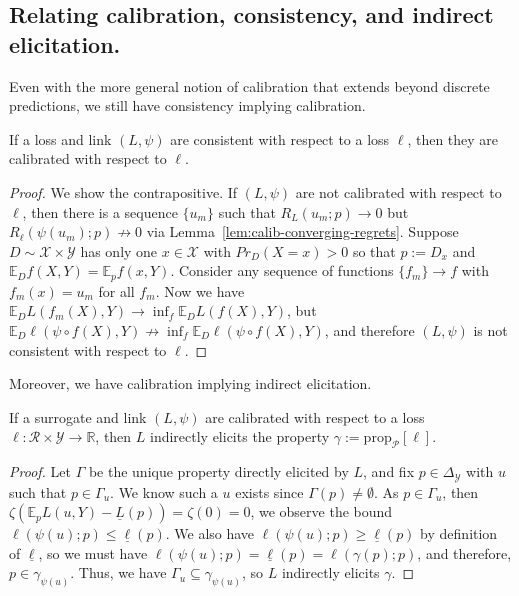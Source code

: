 \documentclass[anon,12pt]{colt2021} %
\newcommand{\reals}{\mathbb{R}}
\newcommand{\simplex}{\Delta_\Y}
\newcommand{\prop}[2][\mathcal{P}]{\mathrm{prop}_{#1}[#2]}
\newcommand{\E}{\mathbb{E}}
\newcommand{\R}{\mathcal{R}}
\newcommand{\X}{\mathcal{X}}
\newcommand{\Y}{\mathcal{Y}}
\newcommand{\exploss}[3]{\E_{#3} #1(#2,Y)}
\newcommand{\risk}[1]{\underline{#1}}
\begin{document}
\subsection{Relating calibration, consistency, and indirect elicitation.}
Even with the more general notion of calibration that extends beyond discrete predictions, we still have consistency implying calibration.
\begin{proposition}\label{prop:consistent-implies-calibrated}
	If a loss and link $(L, \psi)$ are consistent with respect to a loss $\ell$, then they are calibrated with respect to $\ell$.
\end{proposition}
\begin{proof}
	We show the contrapositive.
	If $(L, \psi)$ are not calibrated with respect to $\ell$, then there is a sequence $\{u_m\}$ such that $R_L(u_m; p) \to 0$ but $R_\ell(\psi(u_m); p) \not \to 0$ via Lemma~\ref{lem:calib-converging-regrets}.
	Suppose $D \sim \X \times\Y$ has only one $x \in \X$ with $Pr_D(X = x) > 0$ so that $p := D_x$ and $\E_D f(X,Y) = \E_p f(x, Y)$.
	Consider any sequence of functions $\{f_m\} \to f$ with $f_m(x) = u_m$ for all $f_m$.
	Now we have $\E_D L(f_m(X), Y) \to \inf_f \E_D L(f(X), Y)$, but $\E_D \ell(\psi \circ f(X), Y) \not \to \inf_f \E_D \ell(\psi \circ f(X), Y)$, and therefore $(L, \psi)$ is not consistent with respect to $\ell$.
\end{proof}

Moreover, we have calibration implying indirect elicitation.
\begin{lemma}\label{lem:calib-implies-indir}
	If a surrogate and link $(L, \psi)$ are calibrated with respect to a loss $\ell:\R \times\Y \to \reals$, then $L$ indirectly elicits the property $\gamma := \prop{\ell}$.
\end{lemma}
\begin{proof}
	Let $\Gamma$ be the unique property directly elicited by $L$, and fix $p \in \simplex$ with $u$ such that $p \in \Gamma_u$.
	We know such a $u$ exists since $\Gamma(p) \neq \emptyset$.
	As $p \in \Gamma_u$, then $\zeta(\exploss{L}{u}{p} - \risk{L}(p)) = \zeta(0) = 0$, we observe the bound $\ell(\psi(u); p) \leq \risk{\ell}(p)$.
	We also have $\ell(\psi(u); p) \geq \risk{\ell}(p)$ by definition of $\risk{\ell}$, so we must have $\ell(\psi(u);p) = \risk{\ell}(p) = \ell(\gamma(p); p)$, and therefore, $p \in \gamma_{\psi(u)}$.
	Thus, we have $\Gamma_u \subseteq \gamma_{\psi(u)}$, so $L$ indirectly elicits $\gamma$.
\end{proof}
\end{document}
